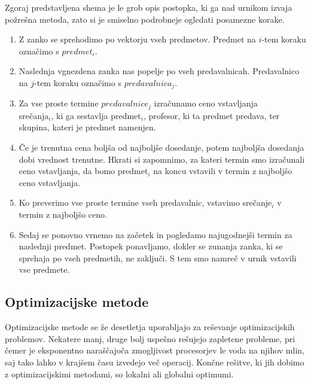 \documentclass[a4paper, 10pt]{article}
\begin{document}
\noindent Zgoraj predstavljena shema je le grob opis postopka, ki ga nad urnikom izvaja požrešna metoda,
zato si je smiselno podrobneje ogledati posamezne korake.
\begin{enumerate}

   \item Z zanko se sprehodimo po vektorju vseh predmetov. Predmet na $i$-tem koraku
   označimo s $predmet_{i}$.

   \item Naslednja vgnezdena zanka nas popelje po vseh predavalnicah. Predavalnico na
   $j$-tem koraku označimo s $predavalnica_{j}$.

   \item Za vse proste termine $predavalnice_{j}$ izračunamo ceno vstavljanja \\
   srečanja$_{i}$, ki ga sestavlja predmet$_{i}$, profesor, ki ta predmet predava,
   ter skupina, kateri je predmet namenjen.

   \item Če je trenutna cena boljša od najboljše dosedanje, potem najboljša dosedanja
   dobi vrednost trenutne. Hkrati si zapomnimo, za kateri termin smo izračunali ceno
   vstavljanja, da bomo predmet$_{i}$ na koncu vstavili v termin z najboljšo
   ceno vstavljanja.

   \item Ko preverimo vse proste termine vseh predavalnic, vstavimo srečanje$_{i}$
   v termin z najboljšo ceno.

   \item Sedaj se ponovno vrnemo na začetek in pogledamo najugodnejši termin za naslednji
   predmet. Postopek ponavljamo, dokler se zunanja zanka, ki se sprehaja po vseh predmetih,
   ne zaključi. S tem smo namreč v urnik vstavili vse predmete.
\end{enumerate}

\subsection{Optimizacijske metode }

Optimizacijske metode se že desetletja uporabljajo za reševanje optimizacijskih problemov.
Nekatere manj, druge bolj uspešno rešujejo zapletene probleme, pri čemer je eksponentno
naraščajoča zmogljivost procesorjev le voda na njihov mlin, saj tako lahko v krajšem
času izvedejo več operacij. Končne rešitve, ki jih dobimo z optimizacijskimi metodami,
so lokalni ali globalni optimumi.
\end{document}
